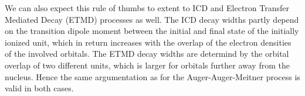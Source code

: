 We can also expect this rule of thumbs to extent to ICD and
Electron Transfer Mediated Decay (ETMD) processes as well. The ICD
decay widths partly depend on the transition dipole moment between the
initial and final state of the initially ionized unit, which in return increases
with the overlap of the electron densities of the involved orbitals.
The ETMD decay widths are determind by the orbital overlap of two different units,
which is larger for orbitals further away from the nucleus.
Hence the same argumentation as for the Auger-Auger-Meitner process is valid in both
cases.



